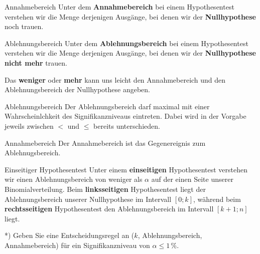 \begin{definition}{Annahmebereich}{}
  Unter dem \textbf{Annahmebereich} bei einem Hypothesentest verstehen
  wir die Menge derjenigen Ausgänge, bei denen wir der
  \textbf{Nullhypothese} noch trauen.
\end{definition}

\begin{definition}{Ablehnungsbereich}{}
  Unter dem \textbf{Ablehnungsbereich} bei einem Hypothesentest verstehen
  wir die Menge derjenigen Ausgänge, bei denen wir der
  \textbf{Nullhypothese} \textbf{nicht mehr} trauen.
\end{definition}




Das \textbf{weniger} oder \textbf{mehr} kann uns leicht den Annahmebereich und den Ablehnungsbereich der Nullhypothese angeben.

\begin{gesetz}{Ablehnungsbereich}{}
  Der Ablehnungsbereich darf maximal mit einer Wahrscheinlchkeit des Signifikanzniveaus eintreten. Dabei wird in der Vorgabe jeweils zwischen $<$ und $\le$ bereits unterschieden.
\end{gesetz}

\begin{gesetz}{Annahmebereich}{}
  Der Annahmebereich ist das Gegenereignis zum Ablehnugsbereich.
\end{gesetz}


\begin{definition}{Einseitiger Hypothesentest}{}
Unter einem \textbf{einseitigen} Hypothesentest verstehen wir einen Ablehnungsbereich von weniger als $\alpha$ auf der einen Seite unserer Binomialverteilung. Beim \textbf{linksseitigen} Hypothesentest liegt der Ablehnungsbereich unserer Nullhypothese im Intervall $[0; k]$, während beim \textbf{rechtsseitigen} Hypothesentest den Ablehnungsbereich im Intervall $[k+1;n]$ liegt.
  \end{definition}

\newpage



*) Geben Sie eine Entscheidungsregel an ($k$, Ablehnungsbereich, Annahmebereich) für ein Signifikanzniveau von $\alpha \le 1\,\%$.



